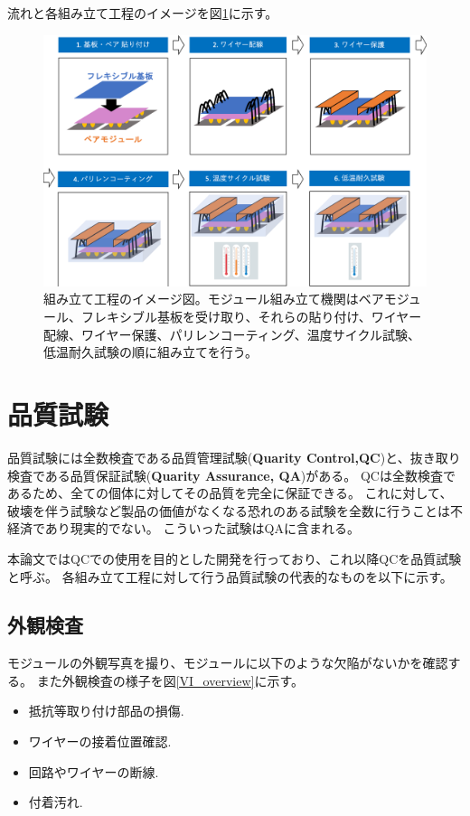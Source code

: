 流れと各組み立て工程のイメージを図\ref{assembly_flow}に示す。
\begin{figure}[bpt]\centering
\includegraphics[width=12cm]{./assembly_flow.png}
\caption[組み立て工程のイメージ図]{組み立て工程のイメージ図。モジュール組み立て機関はベアモジュール、フレキシブル基板を受け取り、それらの貼り付け、ワイヤー配線、ワイヤー保護、パリレンコーティング、温度サイクル試験、低温耐久試験の順に組み立てを行う。}
\label{assembly_flow}
\end{figure}

\section{品質試験}
品質試験には全数検査である品質管理試験(\textbf{Quarity Control,QC})と、抜き取り検査である品質保証試験(\textbf{Quarity Assurance, QA})がある。
QCは全数検査であるため、全ての個体に対してその品質を完全に保証できる。
これに対して、破壊を伴う試験など製品の価値がなくなる恐れのある試験を全数に行うことは不経済であり現実的でない。
こういった試験はQAに含まれる。

本論文ではQCでの使用を目的とした開発を行っており、これ以降QCを品質試験と呼ぶ。
各組み立て工程に対して行う品質試験の代表的なものを以下に示す。

\subsection{外観検査}
モジュールの外観写真を撮り、モジュールに以下のような欠陥がないかを確認する。
また外観検査の様子を図\ref{VI_overview}に示す。
\begin{itemize}
  \item 抵抗等取り付け部品の損傷.
  \item ワイヤーの接着位置確認.
  \item 回路やワイヤーの断線.
  \item 付着汚れ.
\end{itemize}

